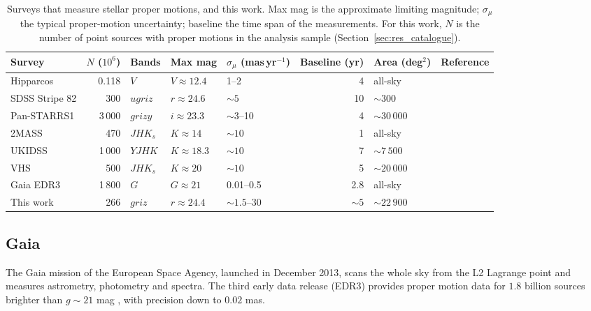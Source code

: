\documentclass[usenatbib]{mnras}   %
\begin{document}
\begin{table}
    \centering
    \caption{Surveys that measure stellar proper motions, and this work. Max mag is the approximate limiting magnitude; $\sigma_\mu$ the typical proper-motion uncertainty; baseline the time span of the measurements. For this work, $N$ is the number of point sources with proper motions in the analysis sample (Section~\ref{sec:res_catalogue}).}
    \label{tab:wide_table}
    \footnotesize
    \setlength{\tabcolsep}{3pt}
    \begin{tabular}{lrlllrll}
    \toprule
    Survey & $N$ ($10^6$) & Bands & Max mag & $\sigma_{\mu}$ (mas\,yr$^{-1}$) & Baseline (yr) & Area (deg$^2$) & Reference \\
    \midrule
    Hipparcos & 0.118 & $V$ & $V \approx 12.4$ & 1--2 & 4 & all-sky & \citet{HIPPARCOS_1997} \\
    SDSS Stripe 82 & 300 & $ugriz$ & $r \approx 24.6$ & $\sim 5$ & 10 & $\sim 300$ & \citet{SDSS_2000} \\
    Pan-STARRS1 & 3\,000 & $grizy$ & $i \approx 23.3$ & $\sim 3$--10 & 4 & $\sim 30\,000$ & \citet{PanSTARRS_2016} \\
    2MASS & 470 & $JHK_s$ & $K \approx 14$ & $\sim 10$ & 1 & all-sky & \citet{2MASS_2003} \\
    UKIDSS & 1\,000 & $YJHK$ & $K \approx 18.3$ & $\sim 10$ & 7 & $\sim 7\,500$ & \citet{UKIDSS_2007} \\
    VHS & 500 & $JHK_s$ & $K \approx 20$ & $\sim 10$ & 5 & $\sim 20\,000$ & \citet{VHS} \\
    Gaia EDR3 & 1\,800 & $G$ & $G \approx 21$ & 0.01--0.5 & 2.8 & all-sky & \citet{GaiaEDR3} \\
    This work & 266 & $griz$ & $r \approx 24.4$ & $\sim 1.5$--30 & $\sim 5$ & $\sim 22\,900$ & \citet{legacy2019} \\
    \bottomrule
    \end{tabular}
\end{table}

\subsection{Gaia}
The Gaia mission of the European Space Agency, launched in December 2013, scans the whole sky from the L2 Lagrange point and measures astrometry, photometry and spectra. The third early data release (EDR3) provides proper motion data for $1.8$ billion sources brighter than $g \sim 21$ mag \citep{GaiaDR3}, with precision down to $0.02$ mas. 
\end{document}

